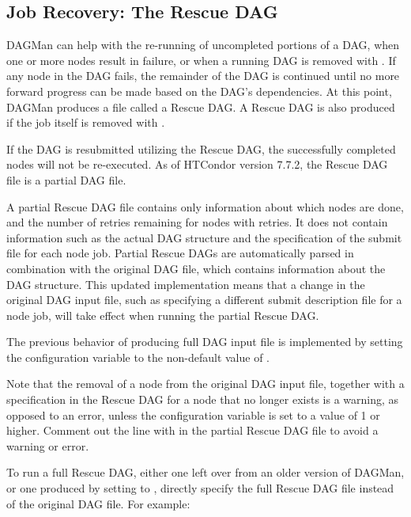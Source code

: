 \subsection{\label{sec:DAGMan-rescue}Job Recovery:  The Rescue DAG}

DAGMan can help with the re-running of uncompleted portions of a DAG, 
when one or more nodes result in failure,
or when a running DAG is removed with .
If any node in the DAG fails,
the remainder of the DAG is continued until no more forward
progress can be made based on the DAG's dependencies.
At this point, DAGMan produces a file called a Rescue DAG.  
A Rescue DAG is also produced if the
 job itself is removed with .

If the DAG is resubmitted utilizing the Rescue DAG,
the successfully completed nodes will not be re-executed.
As of HTCondor version 7.7.2, the Rescue DAG file is a partial DAG file. 

A partial Rescue DAG file contains only information about which nodes are done,
and the number of retries remaining for nodes with retries.  
It does not contain information such as the actual
DAG structure and the specification of the submit file for each node job.  
Partial Rescue DAGs are automatically parsed in combination with
the original DAG file, 
which contains information about the DAG structure.  
This updated implementation means that a change in the original DAG input file,
such as specifying a different submit description file for a node job,
will take effect when running the partial Rescue DAG.

The previous behavior of producing full DAG input file 
is implemented by setting the configuration variable
 to the non-default 
value of .  

Note that the removal of a node from the original DAG input file, 
together with a  specification in the Rescue DAG 
for a node that no longer exists is a warning,
as opposed to an error, 
unless the  configuration
variable is set to a value of 1 or higher.  
Comment out the line with  in the partial Rescue DAG file
to avoid a warning or error.

To run a full Rescue DAG,
either one left over from an older version of DAGMan, 
or one produced by setting  
to , 
directly specify the full Rescue DAG file instead of the original DAG file.
For example:

